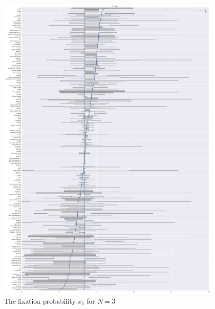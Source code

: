 \documentclass{article}
\begin{document}
\begin{figure}[!hbtp]
    \centering
    \includegraphics[height=.8\textheight]{./img/boxplot_3_invade.pdf}
    \caption{The fixation probability \(x_1\) for \(N=3\)}
    \label{fig:boxplot_3_invade}
\end{figure}
\end{document}
